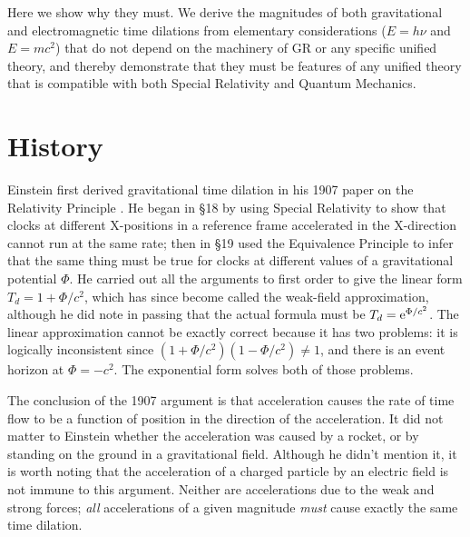 Here we show why they must.
We derive the magnitudes of both gravitational and electromagnetic time dilations
from elementary considerations ($E=h\nu$ and $E=mc^2$)
that do not depend on the machinery of GR or any specific unified theory,
and thereby demonstrate that they must be features
of any unified theory that is compatible with both Special Relativity and Quantum Mechanics.

\section{History}
\label{sec:2}

Einstein first derived gravitational time dilation in his 1907 paper on the Relativity Principle \cite{Einstein1907}.
He began in \S 18 by using Special Relativity to show that clocks at different X-positions in a reference frame accelerated in the X-direction cannot run at the same rate;
then in \S 19 used the Equivalence Principle to infer that the same thing must be true
for clocks at different values of a gravitational potential $\Phi$.
He carried out all the arguments to first order to give the linear form $T_d = 1 + \Phi/c^2$, which has since become called the weak-field approximation,
although he did note in passing that the actual formula must be
$T_d = {\rm e}^{\Phi/c^2}$.
The linear approximation cannot be exactly correct because it has two problems:
it is logically inconsistent since $(1+\Phi/c^2)(1-\Phi/c^2) \ne 1$,
and there is an event horizon at $\Phi = -c^2$.
The exponential form solves both of those problems.

The conclusion of the 1907 argument is that acceleration
causes the rate of time flow to be a function of position
in the direction of the acceleration.
It did not matter to Einstein whether the acceleration was caused by a rocket,
or by standing on the ground in a gravitational field.
Although he didn't mention it,
it is worth noting that the acceleration of a charged particle by an electric field
is not immune to this argument.
Neither are accelerations due to the weak and strong forces;
\textit{all} accelerations of a given magnitude
\textit{must} cause exactly the same time dilation.

